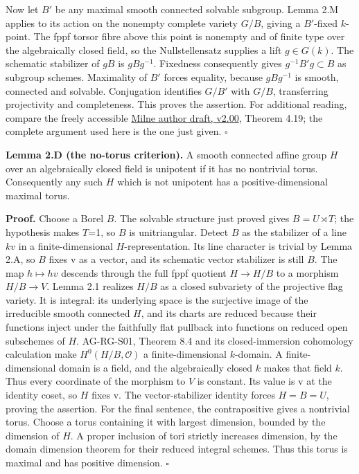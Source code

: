 \documentclass[11pt,a4paper,openany]{report}
\newcounter{none}
\begin{document}
Now let \(B'\) be any maximal smooth connected solvable subgroup. Lemma 2.M applies to its action on the nonempty complete variety \(G/B\), giving a \(B'\)-fixed \(k\)-point. The fppf torsor fibre above this point is nonempty and of finite type over the algebraically closed field, so the Nullstellensatz supplies a lift \(g\in G(k)\). The schematic stabilizer of \(gB\) is \(gBg^{-1}\). Fixedness consequently gives \(g^{-1}B'g\subset B\) as subgroup schemes. Maximality of \(B'\) forces equality, because \(gBg^{-1}\) is smooth, connected and solvable. Conjugation identifies \(G/B'\) with \(G/B\), transferring projectivity and completeness. This proves the assertion. For additional reading, compare the freely accessible \href{https://www.jmilne.org/math/CourseNotes/iAG200.pdf}{Milne author draft, v2.00}, Theorem 4.19; the complete argument used here is the one just given. \(\square\)

\textbf{Lemma 2.D (the no-torus criterion).} A smooth connected affine group \(H\) over an algebraically closed field is unipotent if it has no nontrivial torus. Consequently any such \(H\) which is not unipotent has a positive-dimensional maximal torus.

\textbf{Proof.} Choose a Borel \(B\). The solvable structure just proved gives \(B=U\rtimes T\); the hypothesis makes \(T\)=1, so \(B\) is unitriangular. Detect \(B\) as the stabilizer of a line \(kv\) in a finite-dimensional \(H\)-representation. Its line character is trivial by Lemma 2.A, so \(B\) fixes v as a vector, and its schematic vector stabilizer is still \(B\). The map \(h\mapsto hv\) descends through the full fppf quotient \(H\to H/B\) to a morphism \(H/B\to V\). Lemma 2.1 realizes \(H/B\) as a closed subvariety of the projective flag variety. It is integral: its underlying space is the surjective image of the irreducible smooth connected \(H\), and its charts are reduced because their functions inject under the faithfully flat pullback into functions on reduced open subschemes of \(H\). AG-RG-S01, Theorem 8.4 and its closed-immersion cohomology calculation make \(H^0(H/B,\mathcal O)\) a finite-dimensional \(k\)-domain. A finite-dimensional domain is a field, and the algebraically closed \(k\) makes that field \(k\). Thus every coordinate of the morphism to \(V\) is constant. Its value is v at the identity coset, so \(H\) fixes v. The vector-stabilizer identity forces \(H=B=U\), proving the assertion. For the final sentence, the contrapositive gives a nontrivial torus. Choose a torus containing it with largest dimension, bounded by the dimension of \(H\). A proper inclusion of tori strictly increases dimension, by the domain dimension theorem for their reduced integral schemes. Thus this torus is maximal and has positive dimension. \(\square\)
\end{document}
